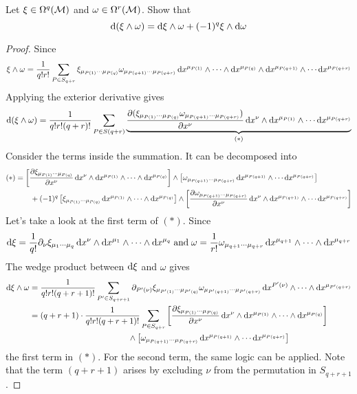 \documentclass[a4paper, 10pt]{article}
\begin{document}

\begin{exer}
    Let $\xi \in \Omega^{q}(\mathcal{M})$ and $\omega \in \Omega^{r}(\mathcal{M})$. Show that
    \[ \mathrm{d}(\xi \wedge \omega) = \mathrm{d}\xi \wedge \omega + (-1)^{q} \xi \wedge \mathrm{d}\omega \]
\end{exer}

\begin{proof}
    Since
    \[ \xi \wedge \omega = \frac{1}{q!r!}\sum_{P \in S_{q+r}}\xi_{\mu_{P(1)}\cdots\mu_{P(q)}}\omega_{\mu_{P(q+1)}\cdots\mu_{P(q+r)}} \, \mathrm{d}{x}^{\mu_{P(1)}} \wedge \cdots \wedge \mathrm{d}{x}^{\mu_{P(q)}} \wedge \mathrm{d}{x}^{\mu_{P(q+1)}} \wedge \cdots \mathrm{d}{x}^{\mu_{P(q+r)}} \]
    Applying the exterior derivative gives
    \[ \mathrm{d}(\xi \wedge \omega) = \frac{1}{q!r!(q+r)!}\sum_{P \in S(q+r)} \underbrace{\frac{\partial(\xi_{\mu_{P(1)}\cdots\mu_{P(q)}}\omega_{\mu_{P(q+1)}\cdots\mu_{P(q+r)}})}{\partial{x}^{\nu}} \, \mathrm{d}{x}^{\nu} \wedge \mathrm{d}{x}^{\mu_{P(1)}} \wedge \cdots \mathrm{d}{x}^{\mu_{P(q+r)}}}_{(\ast)} \]
    Consider the terms inside the summation. It can be decomposed into
    \begin{align*}
        (\ast) &= \left[ \frac{\partial\xi_{\mu_{P(1)}\cdots\mu_{P(q)}}}{\partial{x}^{\nu}} \, \mathrm{d}{x}^{\nu} \wedge \mathrm{d}{x}^{\mu_{P(1)}} \wedge \cdots \wedge \mathrm{d}{x}^{\mu_{P(q)}} \right] \wedge \left[ \omega_{\mu_{P(q+1)}\cdots\mu_{P(q+r)}} \, \mathrm{d}{x}^{\mu_{P(q+1)}} \wedge \cdots \mathrm{d}{x}^{\mu_{P(q+r)}} \right] \\
        &\qquad + (-1)^{q} \left[ \xi_{\mu_{P(1)}\cdots\mu_{P(q)}} \, \mathrm{d}{x}^{\mu_{P(1)}} \wedge \cdots \wedge \mathrm{d}{x}^{\mu_{P(q)}} \right] \wedge \left[ \frac{\partial\omega_{\mu_{P(q+1)}\cdots\mu_{P(q+r)}}}{\partial{x}^{\nu}} \, \mathrm{d}{x}^{\nu} \wedge \mathrm{d}{x}^{\mu_{P(q+1)}} \wedge \cdots \mathrm{d}{x}^{\mu_{P(q+r)}} \right]
    \end{align*}
    Let's take a look at the first term of $(\ast)$. Since
    \[ \mathrm{d}\xi = \frac{1}{q!}\partial_{\nu}\xi_{\mu_{1}\cdots\mu_{q}}\,\mathrm{d}{x}^{\nu}\wedge\mathrm{d}{x}^{\mu_{1}}\wedge\cdots\wedge\mathrm{d}{x}^{\mu_{q}} \;\text{and}\; \omega = \frac{1}{r!}\omega_{\mu_{q+1}\cdots\mu_{q+r}}\,\mathrm{d}{x}^{\mu_{q+1}}\wedge\cdots\wedge\mathrm{d}{x}^{\mu_{q+r}} \]
    The wedge product between $\mathrm{d}\xi$ and $\omega$ gives
    \begin{align*}
        \mathrm{d}\xi\wedge\omega &= \frac{1}{q!r!(q+r+1)!} \sum_{P' \in S_{q+r+1}} \partial_{P'(\nu)}\xi_{\mu_{P'(1)}\cdots\mu_{P'(q)}}\omega_{\mu_{P'(q+1)}\cdots\mu_{P'(q+r)}}\,\mathrm{d}{x}^{P'(\nu)}\wedge\cdots\wedge\mathrm{d}{x}^{\mu_{P'(q+r)}} \\
        &= (q+r+1) \cdot \frac{1}{q!r!(q+r+1)!} \sum_{P \in S_{q+r}} \left[ \frac{\partial\xi_{\mu_{P(1)}\cdots\mu_{P(q)}}}{\partial{x}^{\nu}} \, \mathrm{d}{x}^{\nu} \wedge \mathrm{d}{x}^{\mu_{P(1)}} \wedge \cdots \wedge \mathrm{d}{x}^{\mu_{P(q)}} \right] \\
        & \qquad\qquad\qquad\qquad\qquad\qquad\wedge \left[ \omega_{\mu_{P(q+1)}\cdots\mu_{P(q+r)}} \, \mathrm{d}{x}^{\mu_{P(q+1)}} \wedge \cdots \mathrm{d}{x}^{\mu_{P(q+r)}} \right]
    \end{align*}
    the first term in $(\ast)$. For the second term, the same logic can be applied. Note that the term $(q+r+1)$ arises by excluding $\nu$ from the permutation in $S_{q+r+1}$.
\end{proof}
\end{document}
